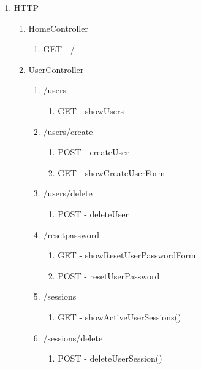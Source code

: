 \documentclass[12pt,DIV14,BCOR10mm,a4paper,twoside,parskip=half-,headsepline,headinclude,english,ngerman,bibliography=totocnumbered]{scrreprt}
\begin{document}
\begin{enumerate}
  \item HTTP
  \begin{enumerate}
    \item HomeController
    \begin{enumerate}
      \item GET - /
    \end{enumerate}

    \item UserController
    \begin{enumerate}
      \item /users
      \begin{enumerate}
        \item GET - showUsers
      \end{enumerate}
      \item /users/create
      \begin{enumerate}
        \item POST - createUser
        \item GET - showCreateUserForm
      \end{enumerate}
      \item /users/delete
      \begin{enumerate}
        \item POST - deleteUser
      \end{enumerate}
      \item /resetpassword
      \begin{enumerate}
        \item GET - showResetUserPasswordForm
        \item POST - resetUserPassword
      \end{enumerate} 
      \item /sessions
      \begin{enumerate}
        \item GET - showActiveUserSessions()
      \end{enumerate}
      \item /sessions/delete
      \begin{enumerate}
        \item POST - deleteUserSession()
      \end{enumerate} 
    \end{enumerate}
    

\end{enumerate}
\end{enumerate}
\end{document}
